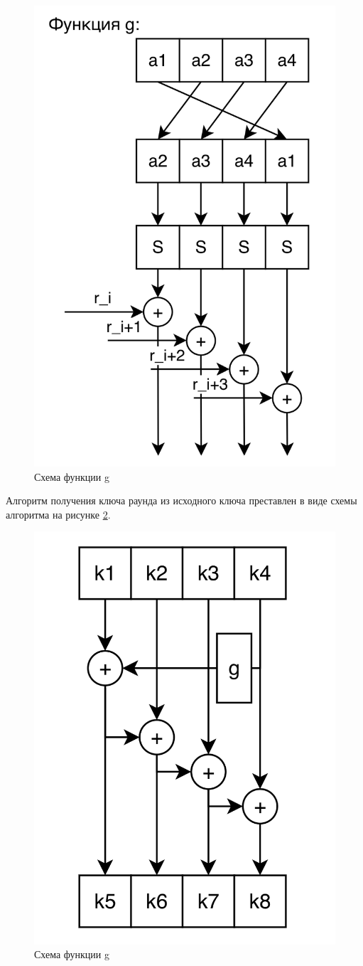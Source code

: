 \begin{figure}[ht!]
	\centering
	\includegraphics[width=0.6\linewidth]{img/g_function.png}
	\caption{Схема функции g}
	\label{img:g_function}
\end{figure}

\clearpage

Алгоритм получения ключа раунда из исходного ключа преставлен в виде схемы алгоритма на рисунке \ref{img:round_keys}.

\begin{figure}[ht!]
	\centering
	\includegraphics[width=0.6\linewidth]{img/round_keys.png}
	\caption{Схема функции g}
	\label{img:round_keys}
\end{figure}

